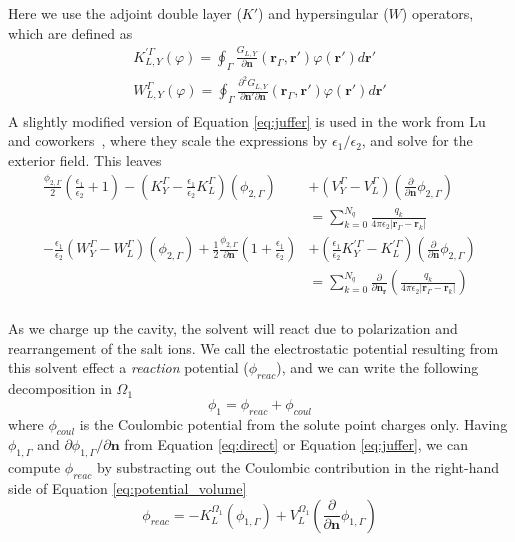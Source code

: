 %
Here we use the adjoint double layer ($K'$) and hypersingular ($W$) operators, which are defined as
%
\begin{align}\label{eq:adj_hyp}
K^{\prime\Gamma}_{L,Y}(\varphi) = \oint_\Gamma \frac{G_{L,Y}}{\partial\mathbf{n}}(\mathbf{r}_\Gamma,\mathbf{r}')\varphi(\mathbf{r}')d\mathbf{r}'\nonumber\\
W^\Gamma_{L,Y}(\varphi) = \oint_\Gamma \frac{\partial^2 G_{L,Y}}{\partial\mathbf{n}'\partial\mathbf{n}}(\mathbf{r}_\Gamma,\mathbf{r}')\varphi(\mathbf{r}')d\mathbf{r}'\nonumber\\
\end{align}
%
A slightly modified version of Equation \eqref{eq:juffer} is used in the work from Lu and coworkers~\cite{LuETal2006,LuETal2009,ZhangETal2019}, where they scale the expressions by $\epsilon_1/\epsilon_2$, and solve for the exterior field. This leaves
%
\begin{align}\label{eq:lu}
\frac{\phi_{2,\Gamma}}{2}\left(\frac{\epsilon_1}{\epsilon_2}+1\right) - \left(K_Y^\Gamma - \frac{\epsilon_1}{\epsilon_2}K_L^\Gamma\right)(\phi_{2,\Gamma}) &+ \left(V_Y^\Gamma - V_L^\Gamma\right)\left( \frac{\partial}{\partial \mathbf{n}} \phi_{2,\Gamma} \right)\nonumber\\ 
&= \sum_{k=0}^{N_q}  \frac{q_k}{4\pi\epsilon_2|\mathbf{r}_{\Gamma} - \mathbf{r}_k|} \nonumber \\
- \frac{\epsilon_1}{\epsilon_2}\left(W_Y^\Gamma - W_L^\Gamma\right)(\phi_{2,\Gamma}) +  \frac{1}{2}\frac{\phi_{2,\Gamma}}{\partial\mathbf{n}}\left(1+\frac{\epsilon_1}{\epsilon_2}\right) &+ \left(\frac{\epsilon_1}{\epsilon_2}K_Y^{\prime\Gamma} - K_L^{\prime\Gamma}\right)\left( \frac{\partial}{\partial \mathbf{n}} \phi_{2,\Gamma} \right)\nonumber\\ 
&= \sum_{k=0}^{N_q}  \frac{\partial}{\partial\mathbf{n}_\mathbf{r}}\left(\frac{q_k}{4\pi\epsilon_2|\mathbf{r}_{\Gamma} - \mathbf{r}_k|}\right) \nonumber \\
\end{align}

As we charge up the cavity, the solvent will react due to polarization and rearrangement of the salt ions. 
We call the electrostatic potential resulting from this solvent effect a \emph{reaction} potential ($\phi_{reac}$), and we can write the following decomposition in $\Omega_1$ 
%
\begin{equation}
\phi_1 = \phi_{reac} + \phi_{coul}
\end{equation}
%
where $\phi_{coul}$ is the Coulombic potential from the solute point charges only.
Having $\phi_{1,\Gamma}$ and $\partial\phi_{1,\Gamma}/\partial\mathbf{n}$ from Equation \eqref{eq:direct} or Equation \eqref{eq:juffer}, we can compute $\phi_{reac}$ by substracting out the Coulombic contribution in the right-hand side of Equation \eqref{eq:potential_volume}
%
\begin{equation}\label{eq:phi_reac}
\phi_{reac} = -K_{L}^{\Omega_1}(\phi_{1,\Gamma}) +  V_{L}^{\Omega_1} \left(\frac{\partial}{\partial \mathbf{n}}  \phi_{1,\Gamma}  \right) 
\end{equation}

